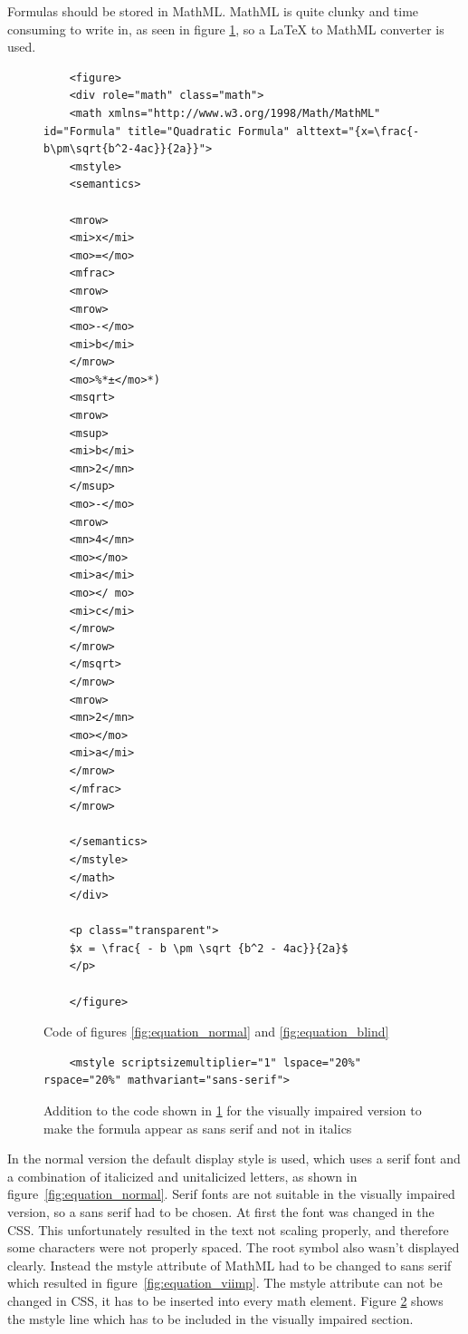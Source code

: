 Formulas should be stored in MathML. MathML is quite clunky and time consuming to write in, as seen in figure \ref{fig:math_code}, so a LaTeX to MathML converter is used. %



\begin{figure}[H]
	
	\lstset{language=HTML}
	\begin{lstlisting}
	<figure>
	<div role="math" class="math">
	<math xmlns="http://www.w3.org/1998/Math/MathML" id="Formula" title="Quadratic Formula" alttext="{x=\frac{-b\pm\sqrt{b^2-4ac}}{2a}}">
	<mstyle>
	<semantics>
	
	<mrow>
	<mi>x</mi>
	<mo>=</mo>
	<mfrac>
	<mrow>
	<mrow>
	<mo>-</mo>
	<mi>b</mi>
	</mrow>
	<mo>%*±</mo>*)
	<msqrt>
	<mrow>
	<msup>
	<mi>b</mi>
	<mn>2</mn>
	</msup>
	<mo>-</mo>
	<mrow>
	<mn>4</mn>
	<mo></mo>
	<mi>a</mi>
	<mo></ mo>
	<mi>c</mi>
	</mrow>
	</mrow>
	</msqrt>
	</mrow>
	<mrow>
	<mn>2</mn>
	<mo></mo>
	<mi>a</mi>
	</mrow>
	</mfrac>
	</mrow> 
	
	</semantics>
	</mstyle>
	</math>
	</div>
	
	<p class="transparent">
	$x = \frac{ - b \pm \sqrt {b^2 - 4ac}}{2a}$
	</p>
	
	</figure>
	\end{lstlisting}
	\caption{Code of figures \ref{fig:equation_normal} and \ref{fig:equation_blind}}
	\label{fig:math_code}
\end{figure}

\begin{figure}[H]
	\lstset{language=HTML}
	\begin{lstlisting}
	<mstyle scriptsizemultiplier="1" lspace="20%" rspace="20%" mathvariant="sans-serif">
	\end{lstlisting}
	\caption{Addition to the code shown in \ref{fig:math_code} for the visually impaired version to make the formula appear as sans serif and not in italics}
	\label{fig:math_vi_code}
\end{figure}






In the normal version the default display style is used, which uses a serif font and a combination of italicized and unitalicized letters, as shown in figure~\ref{fig:equation_normal}. Serif fonts are not suitable in the visually impaired version, so a sans serif had to be chosen. At first the font was changed in the CSS. This unfortunately resulted in the text not scaling properly, and therefore some characters were not properly spaced. The root symbol also wasn't displayed clearly. Instead the mstyle attribute of MathML had to be changed to sans serif which resulted in figure~\ref{fig:equation_viimp}. The mstyle attribute can not be changed in CSS, it has to be inserted into every math element. Figure \ref{fig:math_vi_code} shows the mstyle line which has to be included in the visually impaired section.

